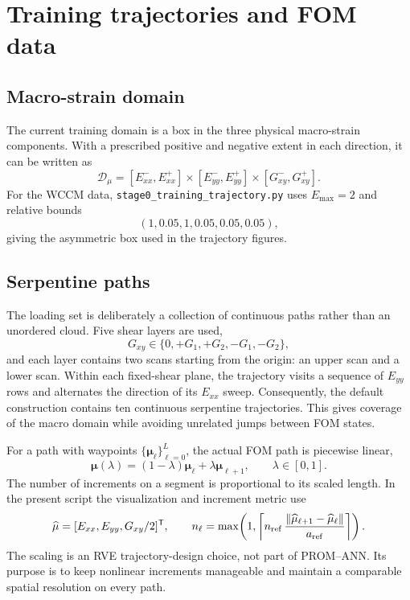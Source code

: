 \documentclass[11pt,a4paper]{article}
\newcommand{\transpose}{^{\mathsf T}}
\newcommand{\norm}[1]{\left\lVert #1 \right\rVert}
\newcommand{\vect}[1]{\mathbf{#1}}
\begin{document}
\section{Training trajectories and FOM data}
\label{sec:trajectories}

\subsection{Macro-strain domain}

The current training domain is a box in the three physical macro-strain
components.  With a prescribed positive and negative extent in each
direction, it can be written as
\begin{equation}
  \mathcal D_\mu
  = [E_{xx}^{-},E_{xx}^{+}]
    \times[E_{yy}^{-},E_{yy}^{+}]
    \times[G_{xy}^{-},G_{xy}^{+}].
  \label{eq:parameter-domain}
\end{equation}
For the WCCM data, \texttt{stage0\_training\_trajectory.py} uses
\(E_{\max}=2\) and relative bounds
\begin{equation}
  (1,0.05,1,0.05,0.05,0.05),
\end{equation}
giving the asymmetric box used in the trajectory figures.

\subsection{Serpentine paths}

The loading set is deliberately a collection of continuous paths rather than
an unordered cloud.  Five shear layers are used,
\begin{equation}
  G_{xy}\in\{0,+G_1,+G_2,-G_1,-G_2\},
  \label{eq:shear-layers}
\end{equation}
and each layer contains two scans starting from the origin:
an upper scan and a lower scan.  Within each fixed-shear plane, the trajectory
visits a sequence of \(E_{yy}\) rows and alternates the direction of its
\(E_{xx}\) sweep.  Consequently, the default construction contains ten
continuous serpentine trajectories.  This gives coverage of the macro domain
while avoiding unrelated jumps between FOM states.

For a path with waypoints \(\{\vect\mu_\ell\}_{\ell=0}^{L}\), the actual FOM
path is piecewise linear,
\begin{equation}
  \vect\mu(\lambda)
  =(1-\lambda)\vect\mu_\ell+\lambda\vect\mu_{\ell+1},
  \qquad \lambda\in[0,1].
  \label{eq:piecewise-linear-path}
\end{equation}
The number of increments on a segment is proportional to its scaled length.
In the present script the visualization and increment metric use
\begin{equation}
  \widehat{\vect\mu}
  = [E_{xx},E_{yy},G_{xy}/2]\transpose,
  \qquad
  n_\ell
  =\max\!\left(1,
  \left\lceil
  n_{\rm ref}\,
  \frac{\norm{\widehat{\vect\mu}_{\ell+1}-\widehat{\vect\mu}_{\ell}}}
       {a_{\rm ref}}
  \right\rceil\right).
  \label{eq:segment-steps}
\end{equation}
The scaling is an RVE trajectory-design choice, not part of PROM--ANN.
Its purpose is to keep nonlinear increments manageable and maintain a
comparable spatial resolution on every path.
\end{document}
